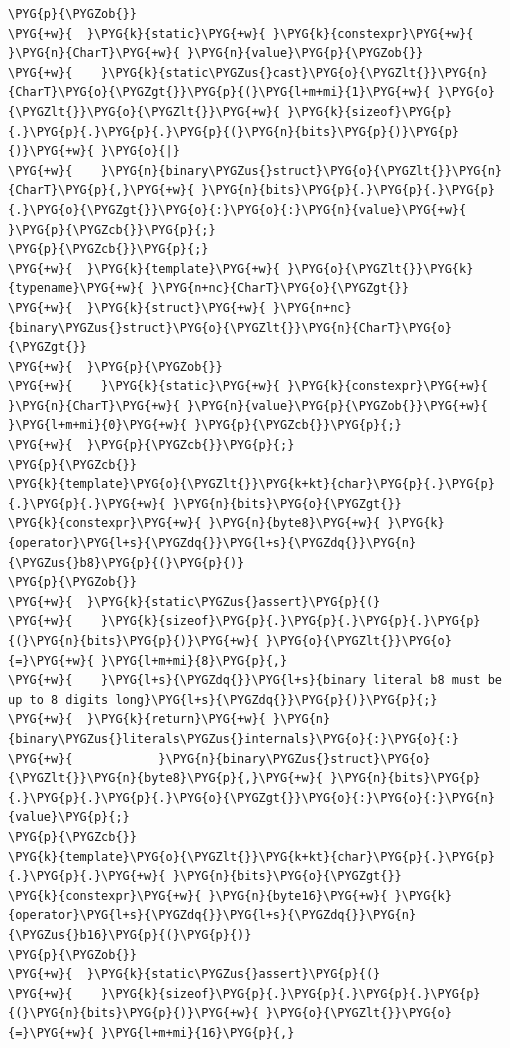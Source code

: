 \begin{codeblockbg}
\begin{Verbatim}[commandchars=\\\{\},breaklines=true,breakanywhere=true,fontsize=\codefont,xleftmargin=17bp]
\PYG{p}{\PYGZob{}}
\PYG{+w}{  }\PYG{k}{static}\PYG{+w}{ }\PYG{k}{constexpr}\PYG{+w}{ }\PYG{n}{CharT}\PYG{+w}{ }\PYG{n}{value}\PYG{p}{\PYGZob{}}
\PYG{+w}{    }\PYG{k}{static\PYGZus{}cast}\PYG{o}{\PYGZlt{}}\PYG{n}{CharT}\PYG{o}{\PYGZgt{}}\PYG{p}{(}\PYG{l+m+mi}{1}\PYG{+w}{ }\PYG{o}{\PYGZlt{}}\PYG{o}{\PYGZlt{}}\PYG{+w}{ }\PYG{k}{sizeof}\PYG{p}{.}\PYG{p}{.}\PYG{p}{.}\PYG{p}{(}\PYG{n}{bits}\PYG{p}{)}\PYG{p}{)}\PYG{+w}{ }\PYG{o}{|}
\PYG{+w}{    }\PYG{n}{binary\PYGZus{}struct}\PYG{o}{\PYGZlt{}}\PYG{n}{CharT}\PYG{p}{,}\PYG{+w}{ }\PYG{n}{bits}\PYG{p}{.}\PYG{p}{.}\PYG{p}{.}\PYG{o}{\PYGZgt{}}\PYG{o}{:}\PYG{o}{:}\PYG{n}{value}\PYG{+w}{ }\PYG{p}{\PYGZcb{}}\PYG{p}{;}
\PYG{p}{\PYGZcb{}}\PYG{p}{;}
\PYG{+w}{  }\PYG{k}{template}\PYG{+w}{ }\PYG{o}{\PYGZlt{}}\PYG{k}{typename}\PYG{+w}{ }\PYG{n+nc}{CharT}\PYG{o}{\PYGZgt{}}
\PYG{+w}{  }\PYG{k}{struct}\PYG{+w}{ }\PYG{n+nc}{binary\PYGZus{}struct}\PYG{o}{\PYGZlt{}}\PYG{n}{CharT}\PYG{o}{\PYGZgt{}}
\PYG{+w}{  }\PYG{p}{\PYGZob{}}
\PYG{+w}{    }\PYG{k}{static}\PYG{+w}{ }\PYG{k}{constexpr}\PYG{+w}{ }\PYG{n}{CharT}\PYG{+w}{ }\PYG{n}{value}\PYG{p}{\PYGZob{}}\PYG{+w}{ }\PYG{l+m+mi}{0}\PYG{+w}{ }\PYG{p}{\PYGZcb{}}\PYG{p}{;}
\PYG{+w}{  }\PYG{p}{\PYGZcb{}}\PYG{p}{;}
\PYG{p}{\PYGZcb{}}
\PYG{k}{template}\PYG{o}{\PYGZlt{}}\PYG{k+kt}{char}\PYG{p}{.}\PYG{p}{.}\PYG{p}{.}\PYG{+w}{ }\PYG{n}{bits}\PYG{o}{\PYGZgt{}}
\PYG{k}{constexpr}\PYG{+w}{ }\PYG{n}{byte8}\PYG{+w}{ }\PYG{k}{operator}\PYG{l+s}{\PYGZdq{}}\PYG{l+s}{\PYGZdq{}}\PYG{n}{\PYGZus{}b8}\PYG{p}{(}\PYG{p}{)}
\PYG{p}{\PYGZob{}}
\PYG{+w}{  }\PYG{k}{static\PYGZus{}assert}\PYG{p}{(}
\PYG{+w}{    }\PYG{k}{sizeof}\PYG{p}{.}\PYG{p}{.}\PYG{p}{.}\PYG{p}{(}\PYG{n}{bits}\PYG{p}{)}\PYG{+w}{ }\PYG{o}{\PYGZlt{}}\PYG{o}{=}\PYG{+w}{ }\PYG{l+m+mi}{8}\PYG{p}{,}
\PYG{+w}{    }\PYG{l+s}{\PYGZdq{}}\PYG{l+s}{binary literal b8 must be up to 8 digits long}\PYG{l+s}{\PYGZdq{}}\PYG{p}{)}\PYG{p}{;}
\PYG{+w}{  }\PYG{k}{return}\PYG{+w}{ }\PYG{n}{binary\PYGZus{}literals\PYGZus{}internals}\PYG{o}{:}\PYG{o}{:}
\PYG{+w}{            }\PYG{n}{binary\PYGZus{}struct}\PYG{o}{\PYGZlt{}}\PYG{n}{byte8}\PYG{p}{,}\PYG{+w}{ }\PYG{n}{bits}\PYG{p}{.}\PYG{p}{.}\PYG{p}{.}\PYG{o}{\PYGZgt{}}\PYG{o}{:}\PYG{o}{:}\PYG{n}{value}\PYG{p}{;}
\PYG{p}{\PYGZcb{}}
\PYG{k}{template}\PYG{o}{\PYGZlt{}}\PYG{k+kt}{char}\PYG{p}{.}\PYG{p}{.}\PYG{p}{.}\PYG{+w}{ }\PYG{n}{bits}\PYG{o}{\PYGZgt{}}
\PYG{k}{constexpr}\PYG{+w}{ }\PYG{n}{byte16}\PYG{+w}{ }\PYG{k}{operator}\PYG{l+s}{\PYGZdq{}}\PYG{l+s}{\PYGZdq{}}\PYG{n}{\PYGZus{}b16}\PYG{p}{(}\PYG{p}{)}
\PYG{p}{\PYGZob{}}
\PYG{+w}{  }\PYG{k}{static\PYGZus{}assert}\PYG{p}{(}
\PYG{+w}{    }\PYG{k}{sizeof}\PYG{p}{.}\PYG{p}{.}\PYG{p}{.}\PYG{p}{(}\PYG{n}{bits}\PYG{p}{)}\PYG{+w}{ }\PYG{o}{\PYGZlt{}}\PYG{o}{=}\PYG{+w}{ }\PYG{l+m+mi}{16}\PYG{p}{,}

\end{Verbatim}
\end{codeblockbg}
